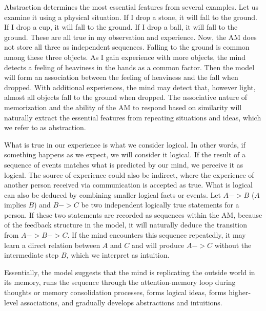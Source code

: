 \documentclass[reprint,amsmath,amssymb,apr,aip,onecolumn, 11pt]{revtex4-1}
\begin{document}
 Abstraction determines the most essential features from several examples. Let us examine it using a physical situation. If I drop a stone, it will fall to the ground. If I drop a cup, it will fall to the ground. If I drop a ball, it will fall to the ground. These are all true in my observation and experience. Now, the AM does not store all three as independent sequences. Falling to the ground is common among these three objects. As I gain experience with more objects, the mind detects a feeling of heaviness in the hands as a common factor. Then the model will form an association between the feeling of heaviness and the fall when dropped. With additional experiences, the mind may detect that, however light, almost all objects fall to the ground when dropped. The associative nature of memorization and the ability of the AM to respond based on similarity will naturally extract the essential features from repeating situations and ideas, which we refer to as abstraction. 
 
 What is true in our experience is what we consider logical. In other words, if something happens as we expect, we will consider it logical. If the result of a sequence of events matches what is predicted by our mind, we perceive it as logical. The source of experience could also be indirect, where the experience of another person received via communication is accepted as true. What is logical can also be deduced by combining smaller logical facts or events.  Let $A->B$ ($A$ implies $B$) and $B->C$ be two independent logically true statements for a person. If these two statements are recorded as sequences within the AM, because of the feedback structure in the model, it will naturally deduce the transition from  $A->B->C$.  If the mind encounters this sequence repeatedly, it may learn a direct relation between $A$ and $C$ and will produce $A->C$ without the intermediate step $B$, which we interpret as intuition. 
 
 Essentially, the model suggests that the mind is replicating the outside world in its memory, runs the sequence through the attention-memory loop during thoughts or memory consolidation processes, forms logical ideas, forms higher-level associations, and gradually develops abstractions and intuitions. 
\end{document}
